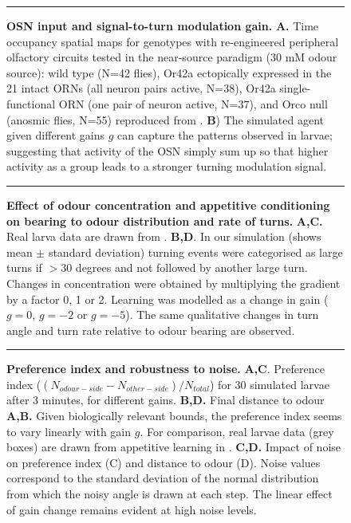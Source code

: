 \documentclass[11pt,a4paper]{article}
\newcommand{\todoBW}[1]{\todo[author=BW,color=orange, size=\tiny,inline]{#1}}
\begin{document}
\begin{figure}[ht!]
\begin{center}
\caption{{\bf OSN input and signal-to-turn modulation gain.}
{\bf A.} Time occupancy spatial maps for genotypes with re-engineered peripheral olfactory circuits tested in the near-source paradigm (30 mM odour source): wild type (N=42 flies), Or42a ectopically expressed in the 21 intact ORNs (all neuron pairs active, N=38), Or42a single-functional ORN (one pair of neuron active, N=37), and Orco null (anosmic flies, N=55) reproduced from \cite{gomez2011active}.
{\bf B}) The simulated agent given different gains $g$ can capture the patterns observed in larvae; suggesting that activity of the OSN simply sum up so that higher activity as a group leads to a stronger turning modulation signal.
\label{fig:OSN}}
\hrule
\end{center}
\end{figure}


\begin{figure}
\begin{center}
\caption{{\bf Effect of odour concentration and appetitive conditioning on bearing to odour distribution and rate of turns.} {\bf A,C.} Real larva data are drawn from \citep{schleyer2015learning}. {\bf B,D}. In our simulation (shows mean $\pm$ standard deviation) turning events were categorised as large turns if $>30$ degrees and not followed by another large turn. Changes in concentration were obtained by multiplying the gradient by a factor 0, 1 or 2. Learning was modelled as a change in gain ($g=0$, $g=-2$ or $g=-5$). The same qualitative changes in turn angle and turn rate relative to odour bearing are observed.
\label{fig:Concentration}}
\hrule
\end{center}
\end{figure}

\begin{figure}
\begin{center}
\caption{{\bf Preference index and robustness to noise. }
{\bf A,C}. Preference index ($(N_{odour-side}-N_{other-side})/N_{total}$) for 30 simulated larvae after 3 minutes, for different gains. {\bf B,D.} Final distance to odour 
{\bf A,B.} Given biologically relevant bounds, the preference index seems to vary linearly with  gain $g$. For comparison, real larvae data (grey boxes) are drawn from appetitive learning in \citep{schleyer2011behavior}.
{\bf C,D.} Impact of noise on preference index (C) and distance to odour (D). Noise values correspond to the standard deviation of the normal distribution from which the noisy angle is drawn at each step. The linear effect of gain change remains evident at high noise levels.
\label{fig:PreferenceIndex}}
\hrule
\end{center}
\end{figure}
\end{document}

